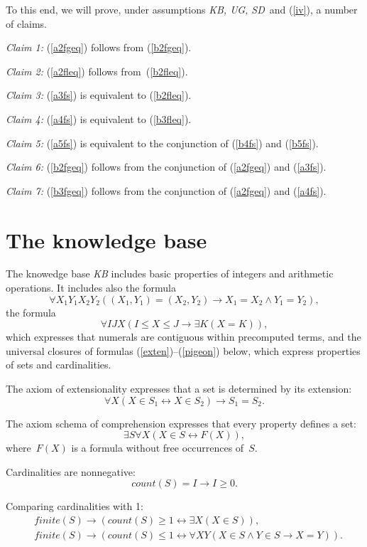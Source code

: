 \documentclass[11pt]{article}
\def\fnt{\mathit{finite}}
\def\lrar{\leftrightarrow}
\def\beq{\begin{equation}}
\def\eeq#1{\label{#1}\end{equation}}
\def\kbugsd{\emph{KB, UG, SD}}
\newcommand{\co}{\ensuremath{\mathit{count}}}
\begin{document}
\begin{adjustwidth}{-1cm}{-1cm}
To this end, we will prove, under assumptions \kbugsd\ and (\ref{iv}),
a number of claims.

\medskip\emph{Claim 1:}
(\ref{a2fgeq}) follows from (\ref{b2fgeq}).

\medskip\emph{Claim 2:}
(\ref{a2fleq}) follows from~(\ref{b2fleq}).

\medskip\emph{Claim 3:}
(\ref{a3fs}) is equivalent to (\ref{b2fleq}).

\medskip\emph{Claim 4:}
(\ref{a4fs}) is equivalent to (\ref{b3fleq}).

\medskip\emph{Claim 5:}
(\ref{a5fs}) is equivalent to the conjunction of (\ref{b4fs}) and
(\ref{b5fs}).

\medskip\emph{Claim 6:}
(\ref{b2fgeq}) follows from  the conjunction of
(\ref{a2fgeq}) and (\ref{a3fs}).

\medskip\emph{Claim 7:}
(\ref{b3fgeq}) follows from  the conjunction of
(\ref{a2fgeq}) and (\ref{a4fs}).

\section{The knowledge base}\label{sec:sets}

The knowedge base \emph{KB} includes basic properties of integers and
arithmetic operations.  It includes also the formula
\beq
\forall X_1Y_1X_2Y_2((X_1,Y_1)=(X_2,Y_2) \to X_1=X_2 \land Y_1=Y_2),
\eeq{op}
the formula
\beq
\forall IJX(I\leq X\leq J \to \exists K(X=K)),
\eeq{contig}
which expresses that numerals are contiguous within precomputed terms,
and the universal closures of
formulas (\ref{exten})--(\ref{pigeon}) below, which express properties of
sets and cardinalities.

The axiom of extensionality
expresses that a set is determined by its extension:
\beq
\forall X(X\in S_1 \lrar X\in S_2) \to S_1=S_2.
\eeq{exten}

The axiom schema of comprehension expresses that
every property defines a set:
\beq
\exists S\forall X(X\in S \lrar F(X)),
\eeq{comprehension}
where~$F(X)$ is a formula without free occurrences of~$S$.

Cardinalities are nonnegative:
\beq
\co(S)=I \to I\geq 0.
\eeq{cardnn}

Comparing cardinalities with 1:
\begin{align}
&\fnt(S) \to (\co(S)\geq 1 \lrar \exists X(X\in S)),\label{geq1}\\
&\fnt(S) \to (\co(S)\leq 1 \lrar
\forall XY(X\in S \land Y\in S \to X=Y)).\label{leq1}
\end{align}


\end{adjustwidth}
\end{document}
